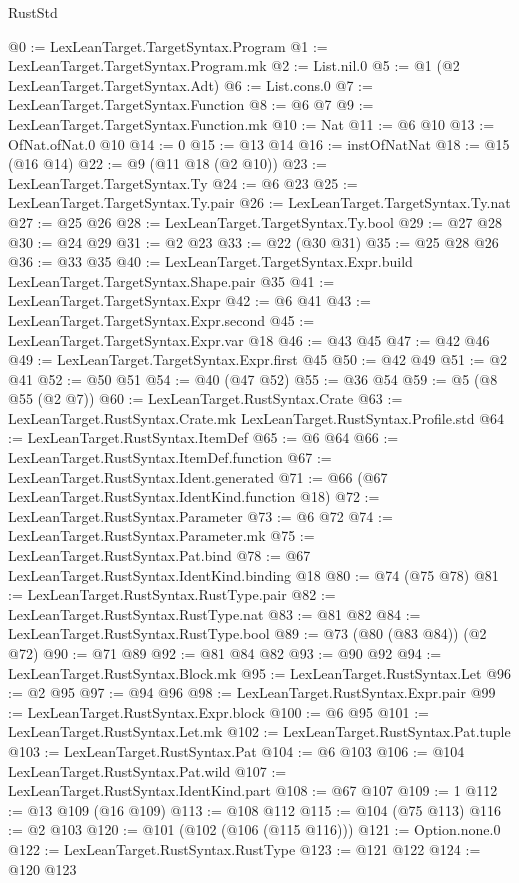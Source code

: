 \begin{lexlean}{RustStd}
\begin{coremodule}
@0 := LexLeanTarget.TargetSyntax.Program
@1 := LexLeanTarget.TargetSyntax.Program.mk
@2 := List.nil.{0}
@5 := @1 (@2 LexLeanTarget.TargetSyntax.Adt)
@6 := List.cons.{0}
@7 := LexLeanTarget.TargetSyntax.Function
@8 := @6 @7
@9 := LexLeanTarget.TargetSyntax.Function.mk
@10 := Nat
@11 := @6 @10
@13 := OfNat.ofNat.{0} @10
@14 := 0
@15 := @13 @14
@16 := instOfNatNat
@18 := @15 (@16 @14)
@22 := @9 (@11 @18 (@2 @10))
@23 := LexLeanTarget.TargetSyntax.Ty
@24 := @6 @23
@25 := LexLeanTarget.TargetSyntax.Ty.pair
@26 := LexLeanTarget.TargetSyntax.Ty.nat
@27 := @25 @26
@28 := LexLeanTarget.TargetSyntax.Ty.bool
@29 := @27 @28
@30 := @24 @29
@31 := @2 @23
@33 := @22 (@30 @31)
@35 := @25 @28 @26
@36 := @33 @35
@40 := LexLeanTarget.TargetSyntax.Expr.build LexLeanTarget.TargetSyntax.Shape.pair @35
@41 := LexLeanTarget.TargetSyntax.Expr
@42 := @6 @41
@43 := LexLeanTarget.TargetSyntax.Expr.second
@45 := LexLeanTarget.TargetSyntax.Expr.var @18
@46 := @43 @45
@47 := @42 @46
@49 := LexLeanTarget.TargetSyntax.Expr.first @45
@50 := @42 @49
@51 := @2 @41
@52 := @50 @51
@54 := @40 (@47 @52)
@55 := @36 @54
@59 := @5 (@8 @55 (@2 @7))
@60 := LexLeanTarget.RustSyntax.Crate
@63 := LexLeanTarget.RustSyntax.Crate.mk LexLeanTarget.RustSyntax.Profile.std
@64 := LexLeanTarget.RustSyntax.ItemDef
@65 := @6 @64
@66 := LexLeanTarget.RustSyntax.ItemDef.function
@67 := LexLeanTarget.RustSyntax.Ident.generated
@71 := @66 (@67 LexLeanTarget.RustSyntax.IdentKind.function @18)
@72 := LexLeanTarget.RustSyntax.Parameter
@73 := @6 @72
@74 := LexLeanTarget.RustSyntax.Parameter.mk
@75 := LexLeanTarget.RustSyntax.Pat.bind
@78 := @67 LexLeanTarget.RustSyntax.IdentKind.binding @18
@80 := @74 (@75 @78)
@81 := LexLeanTarget.RustSyntax.RustType.pair
@82 := LexLeanTarget.RustSyntax.RustType.nat
@83 := @81 @82
@84 := LexLeanTarget.RustSyntax.RustType.bool
@89 := @73 (@80 (@83 @84)) (@2 @72)
@90 := @71 @89
@92 := @81 @84 @82
@93 := @90 @92
@94 := LexLeanTarget.RustSyntax.Block.mk
@95 := LexLeanTarget.RustSyntax.Let
@96 := @2 @95
@97 := @94 @96
@98 := LexLeanTarget.RustSyntax.Expr.pair
@99 := LexLeanTarget.RustSyntax.Expr.block
@100 := @6 @95
@101 := LexLeanTarget.RustSyntax.Let.mk
@102 := LexLeanTarget.RustSyntax.Pat.tuple
@103 := LexLeanTarget.RustSyntax.Pat
@104 := @6 @103
@106 := @104 LexLeanTarget.RustSyntax.Pat.wild
@107 := LexLeanTarget.RustSyntax.IdentKind.part
@108 := @67 @107
@109 := 1
@112 := @13 @109 (@16 @109)
@113 := @108 @112
@115 := @104 (@75 @113)
@116 := @2 @103
@120 := @101 (@102 (@106 (@115 @116)))
@121 := Option.none.{0}
@122 := LexLeanTarget.RustSyntax.RustType
@123 := @121 @122
@124 := @120 @123

\end{coremodule}
\end{lexlean}
